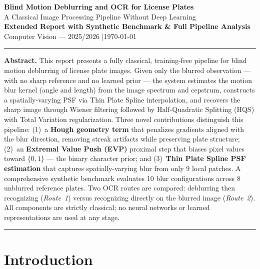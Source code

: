 \documentclass[12pt,a4paper]{article}
\begin{document}

\begin{center}
  {\LARGE\bfseries\color{myblue}
    Blind Motion Deblurring and OCR for License Plates}\\[0.4em]
  {\large A Classical Image Processing Pipeline Without Deep Learning}\\[0.3em]
  {\large\bfseries Extended Report with Synthetic Benchmark \& Full Pipeline Analysis}\\[0.3em]
  {\small Computer Vision --- 2025/2026 \quad|\quad \today}
\end{center}

\noindent\rule{\linewidth}{0.5pt}

\noindent\textbf{Abstract.}
This report presents a fully classical, training-free pipeline for blind motion deblurring
of license plate images. Given only the blurred observation --- with no sharp reference and
no learned prior --- the system estimates the motion blur kernel (angle and length) from the
image spectrum and cepstrum, constructs a spatially-varying PSF via Thin Plate Spline
interpolation, and recovers the sharp image through Wiener filtering followed by
Half-Quadratic Splitting (HQS) with Total Variation regularization. Three novel contributions
distinguish this pipeline: (1)~a \textbf{Hough geometry term} that penalizes gradients
aligned with the blur direction, removing streak artifacts while preserving plate structure;
(2)~an \textbf{Extremal Value Push (EVP)} proximal step that biases pixel values toward
$\{0, 1\}$ --- the binary character prior; and (3)~\textbf{Thin Plate Spline PSF estimation}
that captures spatially-varying blur from only 9 local patches.
A comprehensive synthetic benchmark evaluates 10 blur configurations across 8 unblurred
reference plates. Two OCR routes are compared: deblurring then recognizing (\emph{Route~1})
versus recognizing directly on the blurred image (\emph{Route~2}). All components are
strictly classical; no neural networks or learned representations are used at any stage.

\noindent\rule{\linewidth}{0.5pt}

\tableofcontents
\vspace{0.5em}

\section{Introduction}
\end{document}

